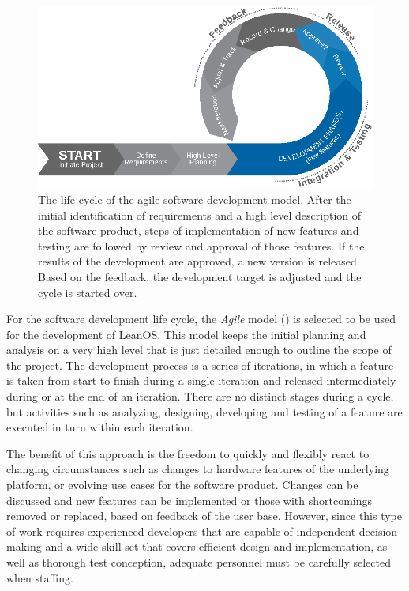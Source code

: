 \begin{figure}[htb]
\begin{center}
	\includegraphics[width=\columnwidth]{images/agile_sw_dev}
	\caption{The life cycle of the agile software development model.
		 After the initial identification of requirements and a high
		 level description of the software product, steps of
		 implementation of new features and testing are followed
		 by review and approval of those features. If the results
		 of the development are approved, a new version is released.
		 Based on the feedback, the development target is adjusted and
		 the cycle is started over.}
	\label{fig:agile_sw}
\end{center}
\end{figure}

\noindent
For the software development life cycle, the \emph{Agile} model ()
is selected to be used for the development of LeanOS.
This model keeps the initial planning and analysis on a very high level that
is just detailed enough to outline the scope of the project. The development
process is a series of iterations, in which a feature is taken from start to
finish during a single iteration and released intermediately during or at the
end of an iteration.
There are no distinct stages during a cycle, but activities
such as analyzing, designing, developing and testing of a feature are executed
in turn within each iteration.

The benefit of this approach is the freedom to quickly and flexibly react to
changing circumstances such as changes to hardware features of the underlying
platform, or evolving use cases for the software product. Changes can be
discussed and new features can be implemented or those with shortcomings removed
or replaced, based on feedback of the user base.
However, since this type of
work requires experienced developers that are capable of independent decision
making and a wide skill set that covers efficient design and implementation, as
well as thorough test conception, adequate personnel must be carefully selected
when staffing.



